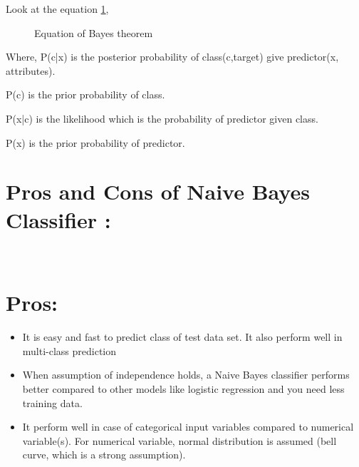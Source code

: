 Look at the equation \ref{fig:naive},

\begin{figure}[h!]\centering
	\caption{Equation of Bayes theorem}
	\label{fig:naive}
\end{figure}

Where,
	P(c|x) is the posterior probability of class(c,target) give predictor(x, attributes).

	P(c) is the prior probability of class.

	P(x|c) is the likelihood which is the probability of predictor given class.
	
	P(x) is the prior probability of predictor.

\chapter{\textbf{Pros and Cons of Naive Bayes Classifier :}}\\
\chapter{\textbf{Pros:}}
\begin{itemize}
	\item It is easy and fast to predict class of test data set. It also perform well in multi-class prediction
	\item When assumption of  independence holds, a Naive Bayes classifier performs better compared to other models like logistic regression and you need less training data.
	\item It perform well in case of categorical input variables compared to numerical variable(s). For numerical variable, normal distribution is assumed (bell curve, which is a strong assumption).
\end{itemize}

